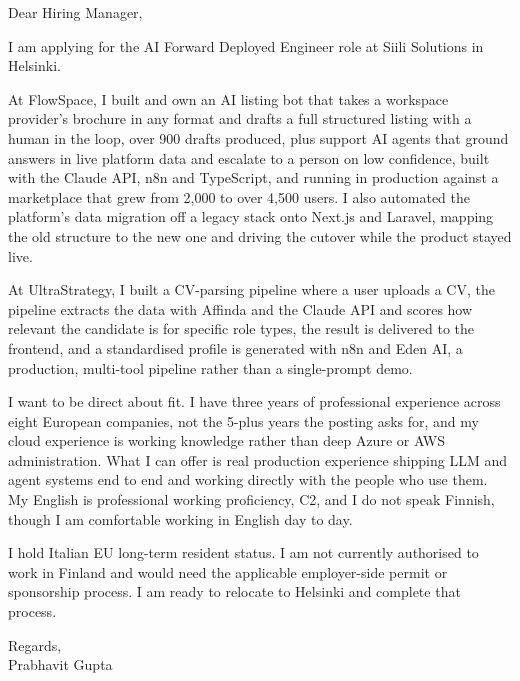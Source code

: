 \documentclass[a4paper,11pt]{article}
\begin{document}
Dear Hiring Manager,

I am applying for the AI Forward Deployed Engineer role at Siili Solutions in Helsinki.

At FlowSpace, I built and own an AI listing bot that takes a workspace provider's brochure in any format and drafts a full structured listing with a human in the loop, over 900 drafts produced, plus support AI agents that ground answers in live platform data and escalate to a person on low confidence, built with the Claude API, n8n and TypeScript, and running in production against a marketplace that grew from 2,000 to over 4,500 users. I also automated the platform's data migration off a legacy stack onto Next.js and Laravel, mapping the old structure to the new one and driving the cutover while the product stayed live.

At UltraStrategy, I built a CV-parsing pipeline where a user uploads a CV, the pipeline extracts the data with Affinda and the Claude API and scores how relevant the candidate is for specific role types, the result is delivered to the frontend, and a standardised profile is generated with n8n and Eden AI, a production, multi-tool pipeline rather than a single-prompt demo.

I want to be direct about fit. I have three years of professional experience across eight European companies, not the 5-plus years the posting asks for, and my cloud experience is working knowledge rather than deep Azure or AWS administration. What I can offer is real production experience shipping LLM and agent systems end to end and working directly with the people who use them. My English is professional working proficiency, C2, and I do not speak Finnish, though I am comfortable working in English day to day.

I hold Italian EU long-term resident status. I am not currently authorised to work in Finland and would need the applicable employer-side permit or sponsorship process. I am ready to relocate to Helsinki and complete that process.

Regards,\\
Prabhavit Gupta
\end{document}
